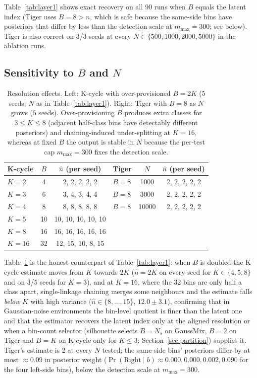 \documentclass[10pt]{article}
\begin{document}
Table~\ref{tab:layer1} shows exact recovery on all 90 runs when $B$ equals
the latent index (Tiger uses $B=8>n$, which is safe because the same-side
bins have posteriors that differ by less than the detection scale at
$m_{\max}=300$; see below).  Tiger is also correct on 3/3 seeds at every
$N\in\{500,1000,2000,5000\}$ in the ablation runs.

\subsection{Sensitivity to $B$ and $N$}

\begin{table}[t]
\centering
\caption{Resolution effects.  Left: K-cycle with over-provisioned $B=2K$
  ($5$ seeds; $N$ as in Table~\ref{tab:layer1}).  Right: Tiger with $B=8$ as
  $N$ grows ($5$ seeds).  Over-provisioning $B$ produces extra classes for
  $3\le K\le8$ (adjacent half-class bins have detectably different posteriors)
  and chaining-induced under-splitting at $K=16$, whereas at fixed $B$ the
  output is stable in $N$ because the per-test cap $m_{\max}=300$ fixes the
  detection scale.}
\label{tab:sensitivity}
\begin{tabular}{lcc@{\qquad}lcc}
\toprule
K-cycle & $B$ & $\hat n$ (per seed) & Tiger & $N$ & $\hat n$ (per seed) \\
\midrule
$K{=}2$  & 4  & 2, 2, 2, 2, 2 & $B{=}8$ & 1000  & 2, 2, 2, 2, 2 \\
$K{=}3$  & 6  & 3, 4, 3, 4, 4 & $B{=}8$ & 3000  & 2, 2, 2, 2, 2 \\
$K{=}4$  & 8  & 8, 8, 8, 8, 8 & $B{=}8$ & 10000 & 2, 2, 2, 2, 2 \\
$K{=}5$  & 10 & 10, 10, 10, 10, 10 & & & \\
$K{=}8$  & 16 & 16, 16, 16, 16, 16 & & & \\
$K{=}16$ & 32 & 12, 15, 10, 8, 15 & & & \\
\bottomrule
\end{tabular}
\end{table}

Table~\ref{tab:sensitivity} is the honest counterpart of Table~\ref{tab:layer1}:
when $B$ is doubled the K-cycle estimate moves from $K$ towards $2K$
($\hat n=2K$ on every seed for $K\in\{4,5,8\}$ and on 3/5 seeds for $K=3$), and at $K=16$, where the 32 bins are only half a class apart, single-linkage chaining merges some neighbours and the estimate falls \emph{below} $K$ with high variance ($\hat n\in\{8,\dots,15\}$, $12.0\pm3.1$), confirming that in Gaussian-noise environments the bin-level
quotient is finer than the latent one and that the estimator recovers the
latent index only at the aligned resolution or when a bin-count selector
(silhouette selects $B=N_s$ on GaussMix, $B=2$ on Tiger and $B=K$ on K-cycle only
for $K\le3$; Section~\ref{sec:partition}) supplies it.  Tiger's estimate is $2$ at every $N$ tested; the
same-side bins' posteriors differ by at most $\approx0.09$ in posterior weight ($\Pr(\text{Right}\mid b)\approx0.000, 0.000, 0.002, 0.090$ for the four left-side bins),
below the detection scale at $m_{\max}=300$.
\end{document}
